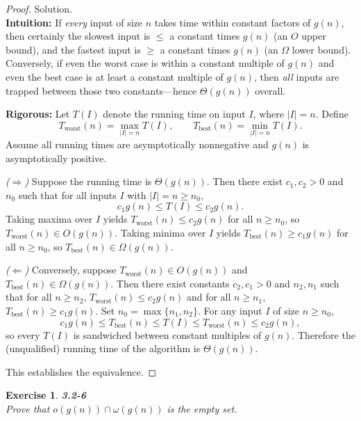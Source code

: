 \documentclass[12pt]{article}
\newtheorem{exercise}[theorem]{Exercise}
\theoremstyle{definition}
\begin{document}
\begin{proof}
Solution. \\

\noindent
\textbf{Intuition:}  
If \emph{every} input of size $n$ takes time within constant factors of $g(n)$, then
certainly the slowest input is $\le$ a constant times $g(n)$ (an $O$ upper bound),
and the fastest input is $\ge$ a constant times $g(n)$ (an $\Omega$ lower bound).
Conversely, if even the worst case is within a constant multiple of $g(n)$ and even
the best case is at least a constant multiple of $g(n)$, then \emph{all} inputs are
trapped between those two constants—hence $\Theta(g(n))$ overall.

\noindent
\textbf{Rigorous:}  
Let $T(I)$ denote the running time on input $I$, where $|I|=n$. Define
\[
T_{\text{worst}}(n)=\max_{|I|=n} T(I), \qquad
T_{\text{best}}(n)=\min_{|I|=n} T(I).
\]
Assume all running times are asymptotically nonnegative and $g(n)$ is asymptotically positive.

\smallskip
\emph{($\Rightarrow$)} Suppose the running time is $\Theta(g(n))$. Then there exist $c_1,c_2>0$
and $n_0$ such that for all inputs $I$ with $|I|=n\ge n_0$,
\[
c_1 g(n) \le T(I) \le c_2 g(n).
\]
Taking maxima over $I$ yields $T_{\text{worst}}(n) \le c_2 g(n)$ for all $n\ge n_0$,
so $T_{\text{worst}}(n)\in O(g(n))$. Taking minima over $I$ yields
$T_{\text{best}}(n) \ge c_1 g(n)$ for all $n\ge n_0$, so
$T_{\text{best}}(n)\in \Omega(g(n))$.

\smallskip
\emph{($\Leftarrow$)} Conversely, suppose
$T_{\text{worst}}(n)\in O(g(n))$ and $T_{\text{best}}(n)\in \Omega(g(n))$.
Then there exist constants $c_2,c_1>0$ and $n_2,n_1$ such that for all $n\ge n_2$,
$T_{\text{worst}}(n)\le c_2 g(n)$ and for all $n\ge n_1$, $T_{\text{best}}(n)\ge c_1 g(n)$.
Set $n_0=\max\{n_1,n_2\}$. For any input $I$ of size $n\ge n_0$,
\[
c_1 g(n) \le T_{\text{best}}(n) \le T(I) \le T_{\text{worst}}(n) \le c_2 g(n),
\]
so every $T(I)$ is sandwiched between constant multiples of $g(n)$.
Therefore the (unqualified) running time of the algorithm is $\Theta(g(n))$.

This establishes the equivalence.
\end{proof}

\newpage

\begin{exercise}
\noindent
\textbf{3.2-6} \\
Prove that $o(g(n)) \cap \omega(g(n))$ is the empty set.
\end{exercise}
\end{document}

